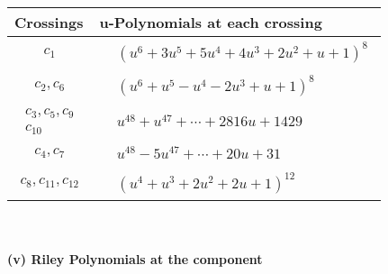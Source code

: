 \documentclass[1p]{elsarticle_modified}
\theoremstyle{definition}
\begin{document}
\begin{tabular}{m{50pt}|m{274pt}}
Crossings & \hspace{64pt}u-Polynomials at each crossing \\
\hline $$\begin{aligned}c_{1}\end{aligned}$$&$\begin{aligned}
&(u^6+3 u^5+5 u^4+4 u^3+2 u^2+u+1)^8
\end{aligned}$\\
\hline $$\begin{aligned}c_{2},c_{6}\end{aligned}$$&$\begin{aligned}
&(u^6+u^5- u^4-2 u^3+u+1)^8
\end{aligned}$\\
\hline $$\begin{aligned}c_{3},c_{5},c_{9}\\c_{10}\end{aligned}$$&$\begin{aligned}
&u^{48}+u^{47}+\cdots+2816 u+1429
\end{aligned}$\\
\hline $$\begin{aligned}c_{4},c_{7}\end{aligned}$$&$\begin{aligned}
&u^{48}-5 u^{47}+\cdots+20 u+31
\end{aligned}$\\
\hline $$\begin{aligned}c_{8},c_{11},c_{12}\end{aligned}$$&$\begin{aligned}
&(u^4+u^3+2 u^2+2 u+1)^{12}
\end{aligned}$\\
\hline
\end{tabular}\\~\\
\newpage\renewcommand{\arraystretch}{1}
\flushleft \textbf{(v) Riley Polynomials at the component}\newline \\
\end{document}
